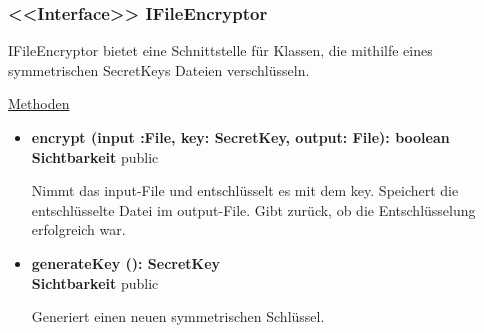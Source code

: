 \subsubsection{<<Interface>> IFileEncryptor} \label{app:klasse:IFileEncryptor}
IFileEncryptor bietet eine Schnittstelle für Klassen, die mithilfe eines symmetrischen SecretKeys Dateien verschlüsseln. \newline

\underline{Methoden}
\begin{itemize}
\itemsep0pt
\item \textbf{encrypt (input :File, key: SecretKey, output: File): boolean}\hfill\\
\textbf{Sichtbarkeit} public

Nimmt das input-File und entschlüsselt es mit dem key. Speichert die entschlüsselte Datei im output-File. Gibt zurück, ob die Entschlüsselung erfolgreich war.

\item \textbf{generateKey (): SecretKey}\hfill\\
\textbf{Sichtbarkeit} public

Generiert einen neuen symmetrischen Schlüssel.

\end{itemize}